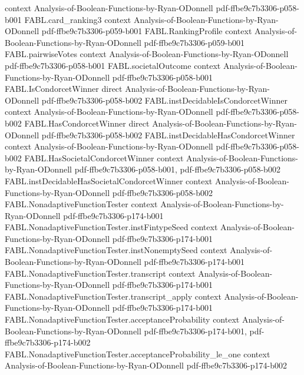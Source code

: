 \begin{theorem}
  {context}
  {Analysis-of-Boolean-Functions-by-Ryan-ODonnell}
  {pdf-ffbe9c7b3306-p058-b001}
\proofstep
  {FABL.card_ranking3}
  {context}
  {Analysis-of-Boolean-Functions-by-Ryan-ODonnell}
  {pdf-ffbe9c7b3306-p059-b001}
\proofstep
  {FABL.RankingProfile}
  {context}
  {Analysis-of-Boolean-Functions-by-Ryan-ODonnell}
  {pdf-ffbe9c7b3306-p059-b001}
\proofstep
  {FABL.pairwiseVotes}
  {context}
  {Analysis-of-Boolean-Functions-by-Ryan-ODonnell}
  {pdf-ffbe9c7b3306-p058-b001}
\proofstep
  {FABL.societalOutcome}
  {context}
  {Analysis-of-Boolean-Functions-by-Ryan-ODonnell}
  {pdf-ffbe9c7b3306-p058-b001}
\proofstep
  {FABL.IsCondorcetWinner}
  {direct}
  {Analysis-of-Boolean-Functions-by-Ryan-ODonnell}
  {pdf-ffbe9c7b3306-p058-b002}
\proofstep
  {FABL.instDecidableIsCondorcetWinner}
  {context}
  {Analysis-of-Boolean-Functions-by-Ryan-ODonnell}
  {pdf-ffbe9c7b3306-p058-b002}
\proofstep
  {FABL.HasCondorcetWinner}
  {direct}
  {Analysis-of-Boolean-Functions-by-Ryan-ODonnell}
  {pdf-ffbe9c7b3306-p058-b002}
\proofstep
  {FABL.instDecidableHasCondorcetWinner}
  {context}
  {Analysis-of-Boolean-Functions-by-Ryan-ODonnell}
  {pdf-ffbe9c7b3306-p058-b002}
\proofstep
  {FABL.HasSocietalCondorcetWinner}
  {context}
  {Analysis-of-Boolean-Functions-by-Ryan-ODonnell}
  {pdf-ffbe9c7b3306-p058-b001,
    pdf-ffbe9c7b3306-p058-b002}
\proofstep
  {FABL.instDecidableHasSocietalCondorcetWinner}
  {context}
  {Analysis-of-Boolean-Functions-by-Ryan-ODonnell}
  {pdf-ffbe9c7b3306-p058-b002}
\proofstep
  {FABL.NonadaptiveFunctionTester}
  {context}
  {Analysis-of-Boolean-Functions-by-Ryan-ODonnell}
  {pdf-ffbe9c7b3306-p174-b001}
\proofstep
  {FABL.NonadaptiveFunctionTester.instFintypeSeed}
  {context}
  {Analysis-of-Boolean-Functions-by-Ryan-ODonnell}
  {pdf-ffbe9c7b3306-p174-b001}
\proofstep
  {FABL.NonadaptiveFunctionTester.instNonemptySeed}
  {context}
  {Analysis-of-Boolean-Functions-by-Ryan-ODonnell}
  {pdf-ffbe9c7b3306-p174-b001}
\proofstep
  {FABL.NonadaptiveFunctionTester.transcript}
  {context}
  {Analysis-of-Boolean-Functions-by-Ryan-ODonnell}
  {pdf-ffbe9c7b3306-p174-b001}
\proofstep
  {FABL.NonadaptiveFunctionTester.transcript_apply}
  {context}
  {Analysis-of-Boolean-Functions-by-Ryan-ODonnell}
  {pdf-ffbe9c7b3306-p174-b001}
\proofstep
  {FABL.NonadaptiveFunctionTester.acceptanceProbability}
  {context}
  {Analysis-of-Boolean-Functions-by-Ryan-ODonnell}
  {pdf-ffbe9c7b3306-p174-b001,
    pdf-ffbe9c7b3306-p174-b002}
\proofstep
  {FABL.NonadaptiveFunctionTester.acceptanceProbability_le_one}
  {context}
  {Analysis-of-Boolean-Functions-by-Ryan-ODonnell}
  {pdf-ffbe9c7b3306-p174-b002}

\end{theorem}
